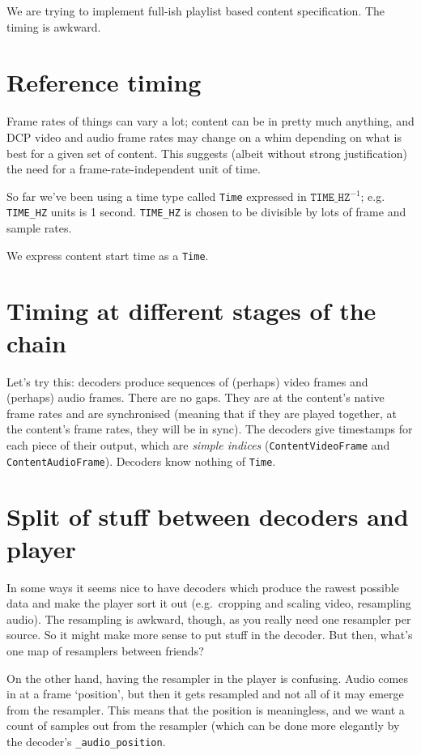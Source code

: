 \documentclass{article}
\begin{document}
We are trying to implement full-ish playlist based content specification.  The timing is awkward.

\section{Reference timing}

Frame rates of things can vary a lot; content can be in pretty much
anything, and DCP video and audio frame rates may change on a whim
depending on what is best for a given set of content.  This suggests
(albeit without strong justification) the need for a frame-rate-independent unit of time.

So far we've been using a time type called \texttt{Time} expressed in
$\mathtt{TIME\_HZ}^{-1}$; e.g. \texttt{TIME\_HZ} units is 1 second.
\texttt{TIME\_HZ} is chosen to be divisible by lots of frame and
sample rates.

We express content start time as a \texttt{Time}.


\section{Timing at different stages of the chain}

Let's try this: decoders produce sequences of (perhaps) video frames
and (perhaps) audio frames.  There are no gaps.  They are at the
content's native frame rates and are synchronised (meaning that if
they are played together, at the content's frame rates, they will be
in sync).  The decoders give timestamps for each piece of their
output, which are \emph{simple indices} (\texttt{ContentVideoFrame}
and \texttt{ContentAudioFrame}).  Decoders know nothing of \texttt{Time}.


\section{Split of stuff between decoders and player}

In some ways it seems nice to have decoders which produce the rawest
possible data and make the player sort it out (e.g.\ cropping and
scaling video, resampling audio).  The resampling is awkward, though,
as you really need one resampler per source.  So it might make more sense
to put stuff in the decoder.  But then, what's one map of resamplers between friends?

On the other hand, having the resampler in the player is confusing.  Audio comes in
at a frame `position', but then it gets resampled and not all of it may emerge from
the resampler.  This means that the position is meaningless, and we want a count
of samples out from the resampler (which can be done more elegantly by the decoder's
\texttt{\_audio\_position}.
\end{document}
